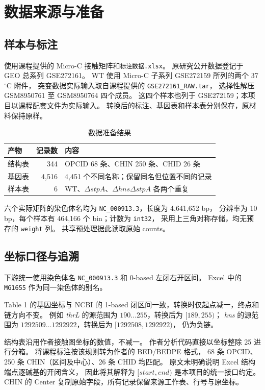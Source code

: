 \section{数据来源与准备}
\subsection{样本与标注}
使用课程提供的 Micro-C 接触矩阵和\texttt{标注数据.xlsx}。
原研究公开数据登记于 GEO 总系列 GSE272161。
WT 使用 Micro-C 子系列 GSE272159 所列的两个 37\,$^\circ$C 附件，
突变数据实际输入取自课程提供的 \texttt{GSE272161\_RAW.tar}，
选择性解压 GSM8950761 至 GSM8950764 四个成员。
这四个样本也列于 GSE272159；本项目以课程配套文件为实际输入。
转换后的标注、基因表和样本表分别保存，原材料保持原样。

\begin{table}[htbp]
\centering
\caption{数据准备结果}
\begin{tabularx}{\linewidth}{l r X}
\toprule
产物 & 记录数 & 内容 \\
\midrule
结构表 & 344 & OPCID 68 条、CHIN 250 条、CHID 26 条 \\
基因表 & 4,516 & 4,451 个不同名称；保留同名但位置不同的记录 \\
样本表 & 6 & WT、$\Delta stpA$、$\Delta hns\Delta stpA$ 各两个重复 \\
\bottomrule
\end{tabularx}
\end{table}

六个实际矩阵的染色体名均为 \texttt{NC\_000913.3}，长度为 4,641,652 bp，
分辨率为 10 bp，每个样本有 464,166 个 bin；计数为 \texttt{int32}，
采用上三角对称存储，均无预存的 \texttt{weight} 列。
共享预处理据此读取原始 counts。

\subsection{坐标口径与追溯}
下游统一使用染色体名 \texttt{NC\_000913.3} 和 0-based 左闭右开区间。
Excel 中的 \texttt{MG1655} 作为同一染色体的别名。

Table 1 的基因坐标与 NCBI 的 1-based 闭区间一致，转换时仅起点减一，终点和链方向不变。
例如 \textit{thrL} 的源范围为 $190\ldots255$，转换后为 $[189,255)$；
\textit{hns} 的源范围为 $1292509\ldots1292922$，转换后为 $[1292508,1292922)$，
仍为负链。

结构表沿用作者接触图坐标的数值，不减一。
作者分析代码直接以坐标整除 25 进行分箱。
将课程标注按该规则转为作者的 BED/BEDPE 格式，
68 条 OPCID、250 条 CHIN（区间及中心）、26 条 CHID 均匹配。
原文未明确说明 Excel 结构端点逐碱基的开闭含义，
因此将其解释为 $[start,end)$ 是本项目的统一接口约定。
CHIN 的 Center 复制原始字段，所有记录保留来源工作表、行号与原坐标。

